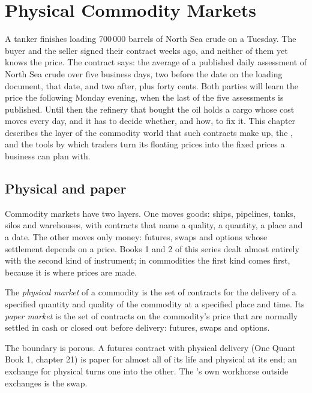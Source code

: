 \chapter{Physical Commodity Markets}\label{ch:m3:physical-commodity-markets}

A tanker finishes loading 700\,000 barrels of North Sea crude on a Tuesday.
The buyer and the seller signed their contract weeks ago, and neither of them
yet knows the price. The contract says: the average of a published daily
assessment of North Sea crude over five business days, two before the date on
the loading document, that date, and two after, plus forty cents. Both parties
will learn the price the following Monday evening, when the last of the five
assessments is published. Until then the refinery that bought the oil holds a
cargo whose cost moves every day, and it has to decide whether, and how, to fix
it. This chapter describes the layer of the commodity world that such contracts
make up, the , and the tools by which traders turn its floating
prices into the fixed prices a business can plan with.

\section{Physical and paper}

Commodity markets have two layers. One moves goods: ships, pipelines, tanks,
silos and warehouses, with contracts that name a quality, a quantity, a place
and a date. The other moves only money: futures, swaps and options whose
settlement depends on a price. Books 1 and 2 of this series dealt almost
entirely with the second kind of instrument; in commodities the first kind comes
first, because it is where prices are made.

\begin{definition}\label{def:m3:physical-commodity-markets:layers}
The \emph{physical market} of a commodity is the set of
contracts for the delivery of a specified quantity and quality of the commodity at
a specified place and time. Its \emph{paper market} is the set
of contracts on the commodity's price that are normally settled in cash or closed
out before delivery: futures, swaps and options.
\end{definition}

The boundary is porous. A futures contract with physical delivery
(One Quant Book 1, chapter 21) is paper for almost all of its life and physical
at its end; an exchange for physical turns one into the other. The 's
own workhorse outside exchanges is the swap.

